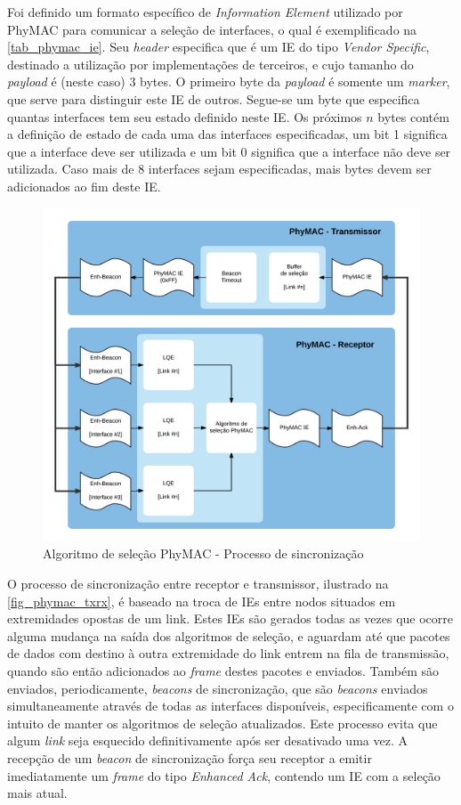 \documentclass[
	12pt,				%
	openright,			%
	oneside,
	a4paper,			%
	english,			%
	french,				%
	spanish,			%
	brazil				%
	]{abntex2}
\begin{document}
Foi definido um formato específico de \textit{Information Element} utilizado por PhyMAC para comunicar a seleção de interfaces, o qual é exemplificado na \autoref{tab_phymac_ie}. Seu \textit{header} especifica que é um IE do tipo \textit{Vendor Specific}, destinado a utilização por implementações de terceiros, e cujo tamanho do \textit{payload} é (neste caso) 3 bytes. O primeiro byte da \textit{payload} é somente um \textit{marker}, que serve para distinguir este IE de outros. Segue-se um byte que especifica quantas interfaces tem seu estado definido neste IE. Os próximos $n$ bytes contém a definição de estado de cada uma das interfaces especificadas, um bit 1 significa que a interface deve ser utilizada e um bit 0 significa que a interface não deve ser utilizada. Caso mais de 8 interfaces sejam especificadas, mais bytes devem ser adicionados ao fim deste IE.

\begin{figure}[hb]
	\centering
	\caption{Algoritmo de seleção PhyMAC - Processo de sincronização}
	\label{fig_phymac_txrx}
	\includegraphics[width=.9\linewidth]{PhyMAC_TXRX}
\end{figure}

O processo de sincronização entre receptor e transmissor, ilustrado na \autoref{fig_phymac_txrx}, é baseado na troca de IEs entre nodos situados em extremidades opostas de um link. Estes IEs são gerados todas as vezes que ocorre alguma mudança na saída dos algoritmos de seleção, e aguardam até que pacotes de dados com destino à outra extremidade do link entrem na fila de transmissão, quando são então adicionados ao \textit{frame} destes pacotes e enviados. Também são enviados, periodicamente, \textit{beacons} de sincronização, que são \textit{beacons} enviados simultaneamente através de todas as interfaces disponíveis, especificamente com o intuito de manter os algoritmos de seleção atualizados. Este processo evita que algum \textit{link} seja esquecido definitivamente após ser desativado uma vez. A recepção de um \textit{beacon} de sincronização força seu receptor a emitir imediatamente um \textit{frame} do tipo \textit{Enhanced Ack}, contendo um IE com a seleção mais atual.
\end{document}
